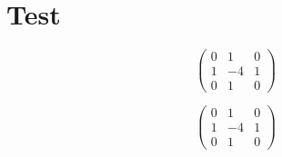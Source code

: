 \documentclass[12pt]{article}
\begin{document}
\section{Test}

\begin{figure}[H]
  \begin{minipage}[b]{0.5\linewidth}
    \centering
    \begin{equation}
    \begin{pmatrix}
    0 & 1 & 0 \\
    1 & -4 & 1\\
    0 & 1 & 0
    \end{pmatrix}
    \end{equation}
  \end{minipage}
    \hspace{0.5cm}
  \begin{minipage}[b]{0.5\linewidth}
    \begin{equation}
    \begin{pmatrix}
    0 & 1 & 0 \\
    1 & -4 & 1\\
    0 & 1 & 0
    \end{pmatrix}
    \end{equation}
  \end{minipage}
\end{figure}
\end{document}
